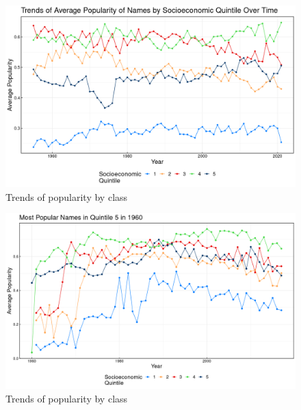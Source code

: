 \begin{figure}[H]
\begin{center}
    \includegraphics[width=15cm]{plot/p3.png}
    \caption{Trends of popularity by class}
    \label{fig:new_names}
\end{center}
\end{figure}

\begin{figure}[H]
\begin{center}
    \includegraphics[width=15cm]{plot/p4.png}
    \caption{Trends of popularity by class}
    \label{fig:new_names}
\end{center}
\end{figure}


